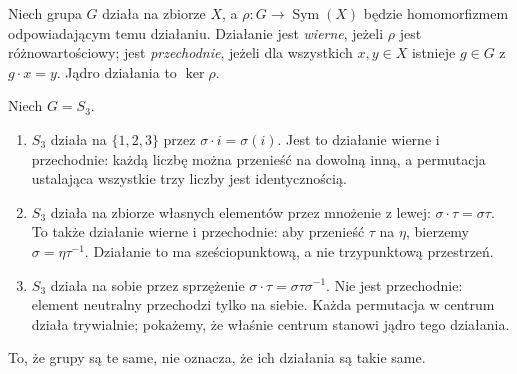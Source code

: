 \begin{definicja}
Niech grupa $G$ działa na zbiorze $X$, a
$\rho:G\to\operatorname{Sym}(X)$ będzie homomorfizmem
odpowiadającym temu działaniu. Działanie jest \emph{wierne}, jeżeli
$\rho$ jest różnowartościowy;
jest \emph{przechodnie}, jeżeli dla wszystkich $x,y\in X$
istnieje $g\in G$ z $g\cdot x=y$.
Jądro działania to $\ker\rho$.
\end{definicja}

\begin{przyklad}
\label{aa:prz:trzy-akcje}
Niech $G=S_3$.
\begin{enumerate}
\item $S_3$ działa na $\{1,2,3\}$ przez $\sigma\cdot i=\sigma(i)$.
Jest to działanie wierne i przechodnie: każdą liczbę można
przenieść na dowolną inną, a permutacja ustalająca wszystkie
trzy liczby jest identycznością.
\item $S_3$ działa na zbiorze własnych elementów przez mnożenie
z lewej: $\sigma\cdot\tau=\sigma\tau$. To także działanie wierne
i przechodnie: aby przenieść $\tau$ na $\eta$, bierzemy
$\sigma=\eta\tau^{-1}$. Działanie to ma sześciopunktową,
a nie trzypunktową przestrzeń.
\item $S_3$ działa na sobie przez sprzężenie
$\sigma\cdot\tau=\sigma\tau\sigma^{-1}$.
Nie jest przechodnie: element neutralny przechodzi tylko na siebie.
Każda permutacja w centrum działa trywialnie; pokażemy,
że właśnie centrum stanowi jądro tego działania.
\end{enumerate}
To, że grupy są te same, nie oznacza, że ich działania są takie same.
\end{przyklad}

